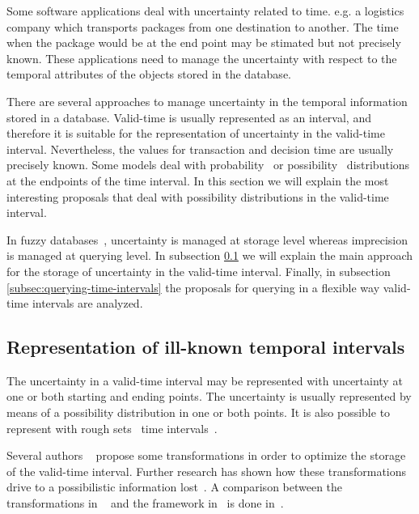 %
%
Some software applications deal with uncertainty related to time. e.g. a logistics company which transports packages from one destination to another. The time when the package would be at the end point may be stimated but not precisely known. These applications need to manage the uncertainty with respect to the temporal attributes of the objects stored in the database.

There are several approaches to manage uncertainty in the temporal information stored in a database. Valid-time is usually represented as an interval, and therefore it is suitable for the representation of uncertainty in the valid-time interval. Nevertheless, the values for transaction and decision time are usually precisely known.
Some models deal with probability~\cite{Dekhtyar2001} or possibility~\cite{Dubois89} distributions at the endpoints of the time interval. In this section we will explain the most interesting proposals that deal with possibility distributions in the valid-time interval. %

In fuzzy databases~\cite{Galindo2006}, uncertainty is managed at storage level whereas imprecision is managed at querying level. In subsection \ref{subsec:representation-time-intervals} we will explain the main approach for the storage of uncertainty in the valid-time interval. Finally, in subsection \ref{subsec:querying-time-intervals} the proposals for querying in a flexible way valid-time intervals are analyzed.

\subsection{Representation of ill-known temporal intervals}
\label{subsec:representation-time-intervals}
The uncertainty in a valid-time interval may be represented with uncertainty at one or both starting and ending points. The uncertainty is usually represented by means of a possibility distribution in one or both points. It is also possible to represent with rough sets~\cite{Pawlak1995} time intervals~\cite{Qia09}.

Several authors ~\cite{garrido2009} propose some transformations in order to optimize the storage of the valid-time interval. Further research has shown how these transformations drive to a possibilistic information lost~\cite{Pon11}. A comparison between the transformations in ~\cite{garrido2009}  and the framework in~\cite{Pon11} is done in~\cite{pon12}. 

